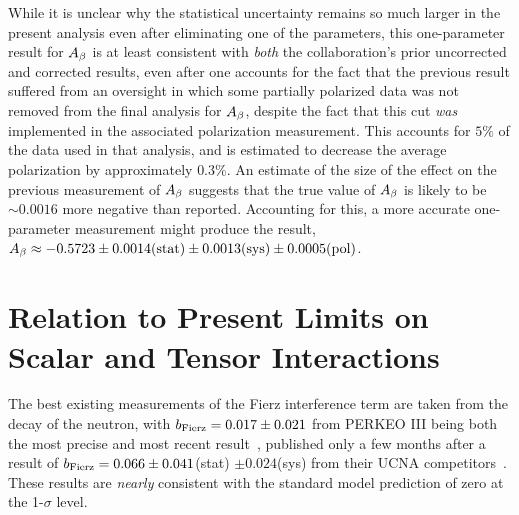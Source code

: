 While it is unclear why the statistical uncertainty remains so much larger in the present analysis even after eliminating one of the parameters, this one-parameter result for $A_{\beta}$ is at least consistent with \emph{both} the collaboration's prior uncorrected and corrected results, even after one accounts for the fact that the previous result suffered from an oversight in which some partially polarized data was not removed from the final analysis for $A_{\beta}$, despite the fact that this cut \emph{was} implemented in the associated polarization measurement.  This accounts for $5\%$ of the data used in that analysis, and is estimated to decrease the average polarization by approximately $0.3\%$.  
An estimate of the size of the effect on the previous measurement of $A_{\beta}$ suggests that the true value of $A_{\beta}$ is likely to be $\sim 0.0016$ more negative than reported.  
Accounting for this, a more accurate one-parameter measurement might produce the result, $\mbox{$A_{\beta} \approx -0.5723 \pm 0.0014(\textrm{stat}) \pm 0.0013(\textrm{sys}) \pm 0.0005(\textrm{pol})$}$.



\section{Relation to Present Limits on Scalar and Tensor Interactions}
\label{sec:scalartensorlimits}
\label{sec:relation_to_other_measurements}
The best existing measurements of the Fierz interference term are taken from the decay of the neutron, with \mbox{$b_{\mathrm{Fierz}} = 0.017 \pm 0.021$} from PERKEO III being both the most precise and most recent result~\cite{Saul2020}, published only a few months after a result of $b_{\mathrm{Fierz}} = 0.066 \pm 0.041$(stat) $\pm 0.024$(sys) from their UCNA competitors~\cite{UCNAfierz2020}.  These results are \emph{nearly} consistent with the standard model prediction of zero at the 1-$\sigma$ level.


